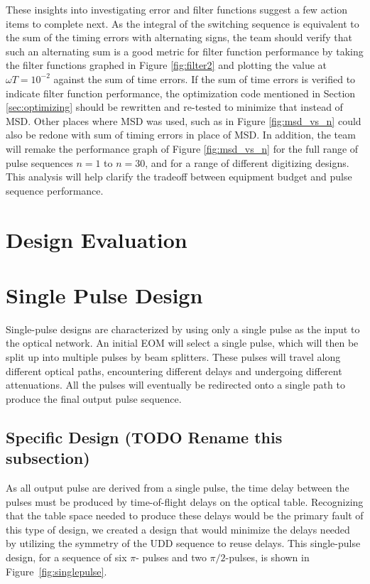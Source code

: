 \documentclass[pdftex,12pt,a4paper]{article}
\begin{document}
These insights into investigating error and filter functions suggest a few action items to complete next. As the integral of the switching sequence is equivalent to the sum of the timing errors with alternating signs, the team should verify that such an alternating sum is a good metric for filter function performance by taking the filter functions graphed in Figure \ref{fig:filter2} and plotting the value at $\omega T = 10^{-2}$ against the sum of time errors. If the sum of time errors is verified to indicate filter function performance, the optimization code mentioned in Section \ref{sec:optimizing} should be rewritten and re-tested to minimize that instead of MSD. Other places where MSD was used, such as in Figure \ref{fig:msd_vs_n} could also be redone with sum of timing errors in place of MSD. In addition, the team will remake the performance graph of Figure \ref{fig:msd_vs_n} for the full range of pulse sequences $n=1$ to $n=30$, and for a range of different digitizing designs.  This analysis will help clarify the tradeoff between equipment budget and pulse sequence performance.

\section{Design Evaluation}
\label{sec:design_evaluation}

\section{Single Pulse Design}
\label{sec:single_pulse_design}
Single-pulse designs are characterized by using only a single pulse as the input to the optical network. An initial EOM will select a single pulse, which will then be split up into multiple pulses by beam splitters. These pulses will travel along different optical paths, encountering different delays and undergoing different attenuations. All the pulses will eventually be redirected onto a single path to produce the final output pulse sequence. 

\subsection{Specific Design (TODO Rename this subsection)}
As all output pulse are derived from a single pulse, the time delay between the pulses must be produced by time-of-flight delays on the optical table. Recognizing that the table space needed to produce these delays would be the primary fault of this type of design, we created a design that would minimize the delays needed by utilizing the symmetry of the UDD sequence to reuse delays. This single-pulse design, for a sequence of six $\pi$- pulses and two $\pi/2$-pulses, is shown in Figure~\ref{fig:singlepulse}. 
\end{document}
